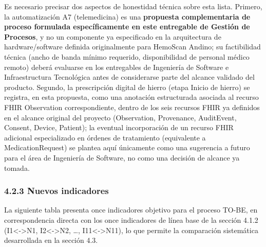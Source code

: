 \documentclass[11pt,a4paper]{article}
\begin{document}
Es necesario precisar dos aspectos de honestidad técnica sobre esta lista. Primero, la automatización A7 (telemedicina) es una \textbf{propuesta complementaria de proceso formulada específicamente en este entregable de Gestión de Procesos}, y no un componente ya especificado en la arquitectura de hardware/software definida originalmente para HemoScan Andino; su factibilidad técnica (ancho de banda mínimo requerido, disponibilidad de personal médico remoto) deberá evaluarse en los entregables de Ingeniería de Software e Infraestructura Tecnológica antes de considerarse parte del alcance validado del producto. Segundo, la prescripción digital de hierro (etapa Inicio de hierro) se registra, en esta propuesta, como una anotación estructurada asociada al recurso FHIR Observation correspondiente, dentro de los seis recursos FHIR ya definidos en el alcance original del proyecto (Observation, Provenance, AuditEvent, Consent, Device, Patient); la eventual incorporación de un recurso FHIR adicional especializado en órdenes de tratamiento (equivalente a MedicationRequest) se plantea aquí únicamente como una sugerencia a futuro para el área de Ingeniería de Software, no como una decisión de alcance ya tomada.

\subsubsection{4.2.3 Nuevos indicadores}\label{nuevos-indicadores}

La siguiente tabla presenta once indicadores objetivo para el proceso TO-BE, en correspondencia directa con los once indicadores de línea base de la sección 4.1.2 (I1\textless-\textgreater N1, I2\textless-\textgreater N2, \ldots, I11\textless-\textgreater N11), lo que permite la comparación sistemática desarrollada en la sección 4.3.
\end{document}
